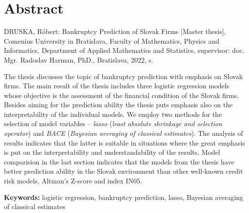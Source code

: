 \thispagestyle{empty}
\section*{Abstract}
DRUSKA, Róbert: Bankruptcy Prediction of Slovak Firms [Master thesis],
Comenius University in Bratislava,
Faculty of Mathematics, Physics and Informatics,
Department of Applied Mathematics and Statistics,
supervisor: doc. Mgr. Radoslav Harman, PhD.,
Bratislava, 2022, \textnormal{\pageref*{LastPage}} s.

The thesis discusses the topic of bankruptcy prediction with emphasis on Slovak firms.
The main result of the thesis includes three logistic regression models whose objective is the assessment of the financial condition of the Slovak firms.
Besides aiming for the prediction ability the thesis puts emphasis also on the interpretability of the individual models.
We employ two methods for the selection of model variables – \emph{lasso} (\emph{least absolute shrinkage and selection operator}) and \emph{BACE} (\emph{Bayesian averaging of classical estimates}).
The analysis of results indicates that the latter is suitable in situations where the great emphasis is put on the interpretability and understandability of the results.
Model comparision in the last section indicates that the models from the thesis have better prediction ability in the
Slovak environment than other well-known credit risk models, Altman’s Z-score and index IN05.

\begin{flushleft}
  \textbf{Keywords:} logistic regression, bankruptcy prediction, lasso, Bayesian averaging of classical estimates
\end{flushleft}